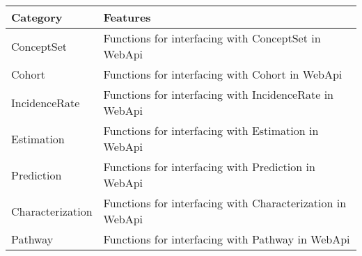 \documentclass[
]{article}
\begin{document}
\begin{longtable}[]{@{}ll@{}}
\toprule
\begin{minipage}[b]{0.21\columnwidth}\raggedright
Category\strut
\end{minipage} & \begin{minipage}[b]{0.73\columnwidth}\raggedright
Features\strut
\end{minipage}\tabularnewline
\midrule
\endhead
\begin{minipage}[t]{0.21\columnwidth}\raggedright
ConceptSet\strut
\end{minipage} & \begin{minipage}[t]{0.73\columnwidth}\raggedright
Functions for interfacing with ConceptSet in WebApi\strut
\end{minipage}\tabularnewline
\begin{minipage}[t]{0.21\columnwidth}\raggedright
Cohort\strut
\end{minipage} & \begin{minipage}[t]{0.73\columnwidth}\raggedright
Functions for interfacing with Cohort in WebApi\strut
\end{minipage}\tabularnewline
\begin{minipage}[t]{0.21\columnwidth}\raggedright
IncidenceRate\strut
\end{minipage} & \begin{minipage}[t]{0.73\columnwidth}\raggedright
Functions for interfacing with IncidenceRate in WebApi\strut
\end{minipage}\tabularnewline
\begin{minipage}[t]{0.21\columnwidth}\raggedright
Estimation\strut
\end{minipage} & \begin{minipage}[t]{0.73\columnwidth}\raggedright
Functions for interfacing with Estimation in WebApi\strut
\end{minipage}\tabularnewline
\begin{minipage}[t]{0.21\columnwidth}\raggedright
Prediction\strut
\end{minipage} & \begin{minipage}[t]{0.73\columnwidth}\raggedright
Functions for interfacing with Prediction in WebApi\strut
\end{minipage}\tabularnewline
\begin{minipage}[t]{0.21\columnwidth}\raggedright
Characterization\strut
\end{minipage} & \begin{minipage}[t]{0.73\columnwidth}\raggedright
Functions for interfacing with Characterization in WebApi\strut
\end{minipage}\tabularnewline
\begin{minipage}[t]{0.21\columnwidth}\raggedright
Pathway\strut
\end{minipage} & \begin{minipage}[t]{0.73\columnwidth}\raggedright
Functions for interfacing with Pathway in WebApi\strut
\end{minipage}\tabularnewline
\bottomrule
\end{longtable}
\end{document}
